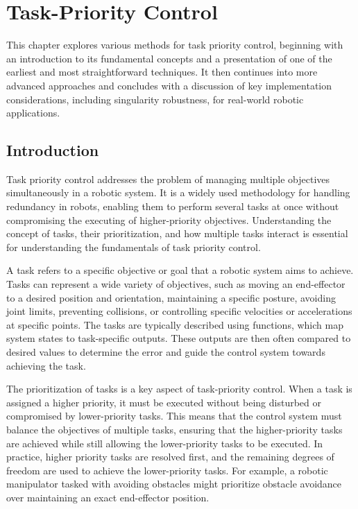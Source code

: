\chapter{Task-Priority Control}
\label{chap:tpc}

This chapter explores various methods for task priority control, beginning with
an introduction to its fundamental concepts and a presentation of one of the
earliest and most straightforward techniques. It then continues into more advanced
approaches and concludes with a discussion of key implementation considerations,
including singularity robustness, for real-world robotic applications.

\section{Introduction}
\label{sec:tpc_intro}

Task priority control addresses the problem of managing multiple objectives simultaneously in a robotic system. It is a widely used methodology for handling redundancy in robots, enabling them to perform several tasks at once without compromising the executing of higher-priority objectives. Understanding the concept of tasks, their prioritization, and how multiple tasks interact is essential for understanding the fundamentals of task priority control.

A task refers to a specific objective or goal that a robotic system aims to achieve. Tasks can represent a wide variety of objectives, such as moving an end-effector to a desired position and orientation, maintaining a specific posture, avoiding joint limits, preventing collisions, or controlling specific velocities or accelerations at specific points. The tasks are typically described using functions, which map system states to task-specific outputs. These outputs are then often compared to desired values to determine the error and guide the control system towards achieving the task.

The prioritization of tasks is a key aspect of task-priority control. When a task is assigned a higher priority, it must be executed without being disturbed or compromised by lower-priority tasks. This means that the control system must balance the objectives of multiple tasks, ensuring that the higher-priority tasks are achieved while still allowing the lower-priority tasks to be executed. In practice, higher priority tasks are resolved first, and the remaining degrees of freedom are used to achieve the lower-priority tasks. For example, a robotic manipulator tasked with avoiding obstacles might prioritize obstacle avoidance over maintaining an exact end-effector position.

